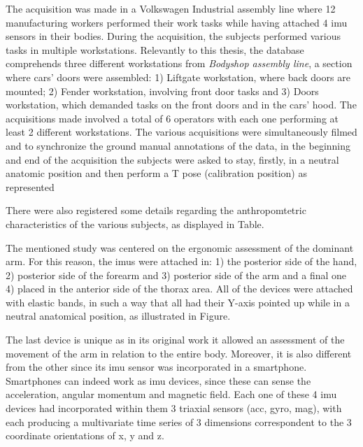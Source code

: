 The acquisition was made in a Volkswagen Industrial assembly line where 12 manufacturing workers performed their work tasks while having attached 4 \gls{imu} sensors in their bodies.
During the acquisition, the subjects performed various tasks in multiple workstations. Relevantly to this thesis, the database comprehends three different workstations from \textit{Bodyshop assembly line}, a section where cars' doors were assembled: 1) Liftgate workstation, where back doors are mounted; 2) Fender workstation, involving front door tasks and 3) Doors workstation, which demanded tasks on the front doors and in the cars' hood\cite{santos2019}. The acquisitions made involved a total of 6 operators with each one performing at least 2 different workstations. The various acquisitions were simultaneously filmed and to synchronize the ground manual annotations of the data, in the beginning and end of the acquisition the subjects were asked to stay, firstly, in a neutral anatomic position and then perform a T pose (calibration position) as represented


There were also registered some details regarding the anthropomtetric characteristics of the various subjects, as displayed in Table. 


The mentioned study was centered on the ergonomic assessment of the dominant arm. For this reason, the \gls{imu}s  were attached in: 1) the posterior side of the hand, 2) posterior side of the forearm and 3) posterior side of the arm and a final one 4) placed in the anterior side of the thorax area. All of the devices were attached with elastic bands, in such a way that all had their Y-axis pointed up while in a neutral anatomical position, as illustrated in Figure. 


The last device is unique as in its original work it allowed an assessment of the movement of the arm in relation to the entire body. Moreover, it is also different from the other since its \gls{imu} sensor was incorporated in a smartphone. Smartphones can indeed work as \gls{imu} devices, since these can sense the acceleration, angular momentum and magnetic field.
Each one of these 4 \gls{imu} devices had incorporated within them 3 triaxial sensors (\gls{acc}, \gls{gyro}, \gls{mag}), with each producing a multivariate time series of 3 dimensions correspondent to the 3 coordinate orientations of x, y and z.

